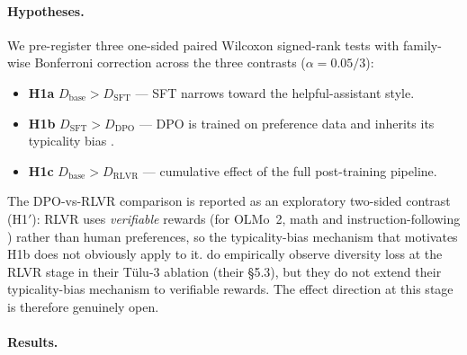 \paragraph{Hypotheses.} We pre-register three one-sided paired Wilcoxon signed-rank tests \citep{dror2018hitchhiker} with family-wise Bonferroni correction across the three contrasts \citep{dror2017replicability} ($\alpha = 0.05/3$):

\begin{itemize}[nosep]
    \item \textbf{H1a} $D_{\mathrm{base}} > D_{\mathrm{SFT}}$ --- SFT narrows toward the helpful-assistant style.
    \item \textbf{H1b} $D_{\mathrm{SFT}} > D_{\mathrm{DPO}}$ --- DPO is trained on preference data and inherits its typicality bias \citep{zhang2025verbalizedsampling}.
    \item \textbf{H1c} $D_{\mathrm{base}} > D_{\mathrm{RLVR}}$ --- cumulative effect of the full post-training pipeline.
\end{itemize}

The DPO-vs-RLVR comparison is reported as an exploratory two-sided contrast (H1$'$): RLVR uses \emph{verifiable} rewards (for OLMo~2, math and instruction-following \citep{olmo2024olmo2}) rather than human preferences, so the typicality-bias mechanism that motivates H1b does not obviously apply to it. \citet{zhang2025verbalizedsampling} do empirically observe diversity loss at the RLVR stage in their T\"ulu-3 ablation (their \S5.3), but they do not extend their typicality-bias mechanism to verifiable rewards. The effect direction at this stage is therefore genuinely open.

\paragraph{Results.}

\begin{table}[h]
\centering
\caption{Per-prompt $D = C \times a_n$ by OLMo-2-7B stage, with pre-registered paired tests.}
\label{tab:rlhf-diversity}
\small
{}
\end{table}

